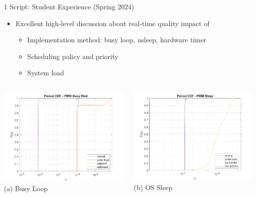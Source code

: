 \documentclass[xcolor={dvipsnames,table}, aspectratio=169]{beamer}
\begin{document}
\begin{frame}{1 Script: Student Experience (Spring 2024)} 
    \begin{infobox}
    \begin{itemize}
        \item Excellent high-level discussion about real-time quality impact of
        \begin{itemize}
            \item Implementation method: busy loop, usleep, hardware timer
            \item Scheduling policy and priority 
            \item System load 
        \end{itemize}
    \end{itemize}
    \end{infobox}
    \begin{columns}
        \includegraphics[width=\textwidth]{../1-script/period_busy.png}
        \tiny\centering (a) Busy Loop
        
        \includegraphics[width=\textwidth]{../1-script/period_sleep.png}
        \tiny\centering (b) OS Sleep
        

\end{columns}
\end{frame}
\end{document}

